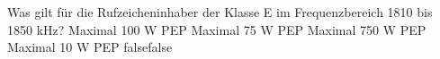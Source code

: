     {Was gilt für die Rufzeicheninhaber der Klasse E im Frequenzbereich 1810 bis 1850 kHz?}
    {Maximal 100 W PEP}
    {Maximal 75 W PEP }
    {Maximal 750 W PEP}
    {Maximal 10 W PEP}
    {false}{false}